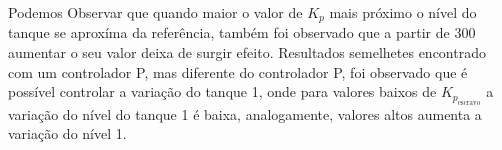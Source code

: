 Podemos Observar que quando maior o valor de $K_p$ mais próximo o nível do tanque se aproxíma da referência, também foi observado que a partir de 300
aumentar o seu valor deixa de surgir efeito. Resultados semelhetes encontrado com um controlador P, mas  diferente do controlador P, foi observado que é possível
controlar a variação do tanque 1, onde para valores baixos de  $K_{p_{\textrm{escravo}}}$ a variação do nível do tanque 1 é baixa,
analogamente, valores altos aumenta a variação do nível 1.